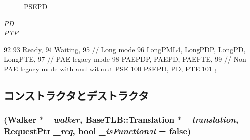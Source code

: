 \begin{Desc}
\begin{description}
{\hypertarget{classX86ISA_1_1Walker_1_1WalkerState_a5d74787dedbc4e11c1ab15bf487e61f8a933f57294495f648d2d4d572f7123df7}{
PSEPD}
\label{classX86ISA_1_1Walker_1_1WalkerState_a5d74787dedbc4e11c1ab15bf487e61f8a933f57294495f648d2d4d572f7123df7}
}]\item[{\em 
\hypertarget{classX86ISA_1_1Walker_1_1WalkerState_a5d74787dedbc4e11c1ab15bf487e61f8aefbc069e0ac4cd293f3ba527bec2befe}{
PD}
\label{classX86ISA_1_1Walker_1_1WalkerState_a5d74787dedbc4e11c1ab15bf487e61f8aefbc069e0ac4cd293f3ba527bec2befe}
}]\item[{\em 
\hypertarget{classX86ISA_1_1Walker_1_1WalkerState_a5d74787dedbc4e11c1ab15bf487e61f8a788b556d960eb5a1c7dc8cf2e058c010}{
PTE}
\label{classX86ISA_1_1Walker_1_1WalkerState_a5d74787dedbc4e11c1ab15bf487e61f8a788b556d960eb5a1c7dc8cf2e058c010}
}]\end{description}
\end{Desc}




\begin{DoxyCode}
92                        {
93                 Ready,
94                 Waiting,
95                 // Long mode
96                 LongPML4, LongPDP, LongPD, LongPTE,
97                 // PAE legacy mode
98                 PAEPDP, PAEPD, PAEPTE,
99                 // Non PAE legacy mode with and without PSE
100                 PSEPD, PD, PTE
101             };
\end{DoxyCode}


\subsection{コンストラクタとデストラクタ}
\hypertarget{classX86ISA_1_1Walker_1_1WalkerState_ac84e175444e79eb369ed3d6debdb601f}{
\subsubsection[{WalkerState}]{ ({\bf Walker} $\ast$ {\em \_\-walker}, \/  {\bf BaseTLB::Translation} $\ast$ {\em \_\-translation}, \/  {\bf RequestPtr} {\em \_\-req}, \/  bool {\em \_\-isFunctional} = {\ttfamily false})}}
\label{classX86ISA_1_1Walker_1_1WalkerState_ac84e175444e79eb369ed3d6debdb601f}



